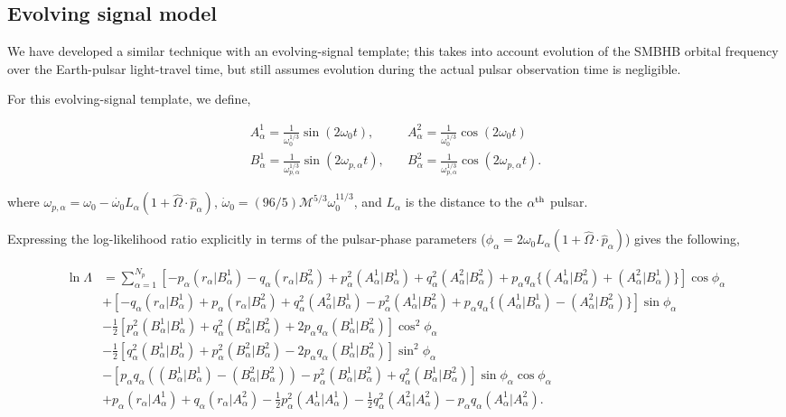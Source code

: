 \documentclass[prd,showpacs,nofootinbib]{revtex4}
\begin{document}
\subsection{Evolving signal model}

We have developed a similar technique with an evolving-signal template; this takes into account evolution of the SMBHB orbital frequency over the Earth-pulsar light-travel time, but still assumes evolution during the actual pulsar observation time is negligible.

For this evolving-signal template, we define,

\begin{align}
A^1_{\alpha} = \frac{1}{\omega_0^{1/3}}\sin(2\omega_0 t),&\quad A^2_{\alpha} = \frac{1}{\omega_0^{1/3}}\cos(2\omega_0 t) \nonumber\\
B^1_{\alpha} = \frac{1}{\omega_{p,\alpha}^{1/3}}\sin(2\omega_{p,\alpha} t),&\quad B^2_{\alpha} = \frac{1}{\omega_{p,\alpha}^{1/3}}\cos(2\omega_{p,\alpha} t).
\end{align}

where $\omega_{p,\alpha} = \omega_0 - \dot{\omega_0}L_{\alpha}(1+\hat{\Omega}\cdot\hat{p}_{\alpha})$, $\dot\omega_0 = (96/5)\mathcal{M}^{5/3}\omega_0^{11/3}$, and $L_{\alpha}$ is the distance to the $\alpha^{\rm th}$ pulsar. 

Expressing the log-likelihood ratio explicitly in terms of the pulsar-phase parameters ($\phi_{\alpha}=2\omega_0L_{\alpha}(1+\hat{\Omega}\cdot\hat{p}_{\alpha})$) gives the following,


\begin{align}
\ln\Lambda &= \sum_{\alpha=1}^{N_p}\left[-p_{\alpha}(r_{\alpha}|B^1_{\alpha})-q_{\alpha}(r_{\alpha}|B^2_{\alpha})+p_{\alpha}^2(A^1_{\alpha}|B^1_{\alpha})+q_{\alpha}^2(A^2_{\alpha}|B^2_{\alpha})+p_{\alpha}q_{\alpha}\{(A^1_{\alpha}|B^2_{\alpha})+(A^2_{\alpha}|B^1_{\alpha})\}\right]\cos\phi_{\alpha} \nonumber\\
&+ \left[-q_{\alpha}(r_{\alpha}|B^1_{\alpha})+p_{\alpha}(r_{\alpha}|B^2_{\alpha})+q_{\alpha}^2(A^2_{\alpha}|B^1_{\alpha})-p_{\alpha}^2(A^1_{\alpha}|B^2_{\alpha})+p_{\alpha}q_{\alpha}\{(A^1_{\alpha}|B^1_{\alpha})-(A^2_{\alpha}|B^2_{\alpha})\}\right]\sin\phi_{\alpha} \nonumber\\
&- \frac{1}{2}\left[p_{\alpha}^2(B^1_{\alpha}|B^1_{\alpha})+q_{\alpha}^2(B^2_{\alpha}|B^2_{\alpha})+2p_{\alpha}q_{\alpha}(B^1_{\alpha}|B^2_{\alpha})\right]\cos^2\phi_{\alpha} \nonumber\\
&- \frac{1}{2}\left[q_{\alpha}^2(B^1_{\alpha}|B^1_{\alpha})+p_{\alpha}^2(B^2_{\alpha}|B^2_{\alpha})-2p_{\alpha}q_{\alpha}(B^1_{\alpha}|B^2_{\alpha})\right]\sin^2\phi_{\alpha} \nonumber\\
&- \left[p_{\alpha}q_{\alpha}((B^1_{\alpha}|B^1_{\alpha})-(B^2_{\alpha}|B^2_{\alpha}))-p_{\alpha}^2(B^1_{\alpha}|B^2_{\alpha})+q_{\alpha}^2(B^1_{\alpha}|B^2_{\alpha})\right]\sin\phi_{\alpha}\cos\phi_{\alpha} \nonumber\\
&+ p_{\alpha}(r_{\alpha}|A^1_{\alpha}) + q_{\alpha}(r_{\alpha}|A^2_{\alpha}) - \frac{1}{2}p_{\alpha}^2(A^1_{\alpha}|A^1_{\alpha}) - \frac{1}{2}q_{\alpha}^2(A^2_{\alpha}|A^2_{\alpha}) - p_{\alpha}q_{\alpha}(A^1_{\alpha}|A^2_{\alpha}).
\end{align}
\end{document}
